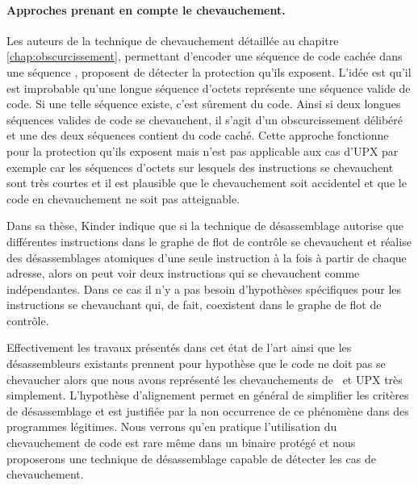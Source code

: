 \paragraph{Approches prenant en compte le chevauchement.}
Les auteurs de la technique de chevauchement détaillée au chapitre \ref{chap:obscurcissement}, permettant d'encoder une séquence de code cachée dans une séquence \cite{JLH13}, proposent de détecter  la protection qu'ils exposent. 
L'idée est qu'il est improbable qu'une longue séquence d'octets représente une séquence valide de code. 
Si une telle séquence existe, c'est sûrement du code. Ainsi si deux longues séquences valides de code se chevauchent, il s'agit d'un obscurcissement délibéré et une des deux séquences contient du code caché. 
Cette approche fonctionne pour la protection qu'ils exposent mais n'est pas applicable aux cas d'UPX par exemple car les séquences d'octets sur lesquels des instructions se chevauchent sont très courtes et il est plausible que le chevauchement soit accidentel et que le code en chevauchement ne soit pas atteignable.

Dans sa thèse, Kinder \cite{Kinder10} indique que si la technique de désassemblage autorise que différentes instructions dans le graphe de flot de contrôle se chevauchent et réalise des désassemblages atomiques d'une seule instruction à la fois à partir de chaque adresse, alors on peut voir deux instructions qui se chevauchent comme indépendantes.
Dans ce cas il n'y a pas besoin d'hypothèses spécifiques pour les instructions se chevauchant qui, de fait, coexistent dans le graphe de flot de contrôle.

Effectivement les travaux présentés dans cet état de l'art ainsi que les désassembleurs existants prennent pour hypothèse que le code ne doit pas se chevaucher alors que nous avons représenté les chevauchements de \telock\ et UPX très simplement. 
L'hypothèse d'alignement permet en général de simplifier les critères de désassemblage et est justifiée par la non occurrence de ce phénomène dans des programmes légitimes.
Nous verrons qu'en pratique l'utilisation du chevauchement de code est rare même dans un binaire protégé et nous proposerons une technique de désassemblage capable de détecter les cas de chevauchement.

